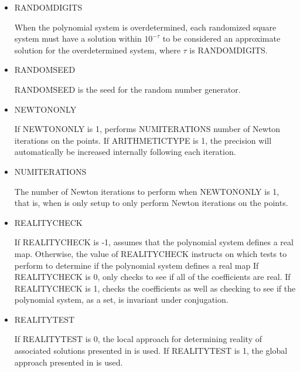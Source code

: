 \documentclass[11pt]{report}
\begin{document}
\begin{itemize}
\item RANDOMDIGITS

When the polynomial system is overdetermined, each randomized square system must
have a solution within $10^{-\tau}$ to be considered an approximate solution
for the overdetermined system, where $\tau$ is RANDOMDIGITS.

\item RANDOMSEED

RANDOMSEED is the seed for the random number generator.

\item NEWTONONLY

If NEWTONONLY is 1, \blueharvestS performs NUMITERATIONS number of Newton iterations on the points.
If ARITHMETICTYPE is 1, the precision will automatically be increased internally following each iteration.

\item NUMITERATIONS

The number of Newton iterations to perform when NEWTONONLY is 1, that is, when \blueharvestS is
only setup to only perform Newton iterations on the points.

\item REALITYCHECK

If REALITYCHECK is -1, \blueharvestS assumes that the polynomial system defines a real map.
Otherwise, the value of REALITYCHECK instructs \blueharvestS on which tests to perform
to determine if the polynomial system defines a real map
If REALITYCHECK is 0, \blueharvestS only checks to see if all of the coefficients
are real.  If REALITYCHECK is 1, \blueharvestS checks the coefficients as well as
checking to see if the polynomial system, as a set, is invariant under conjugation.

\item REALITYTEST

If REALITYTEST is 0, the local approach for determining reality of associated solutions
presented in \cite{HS10} is used.  If REALITYTEST is 1, the global approach presented
in \cite{HS10} is used.

\end{itemize}
\end{document}
